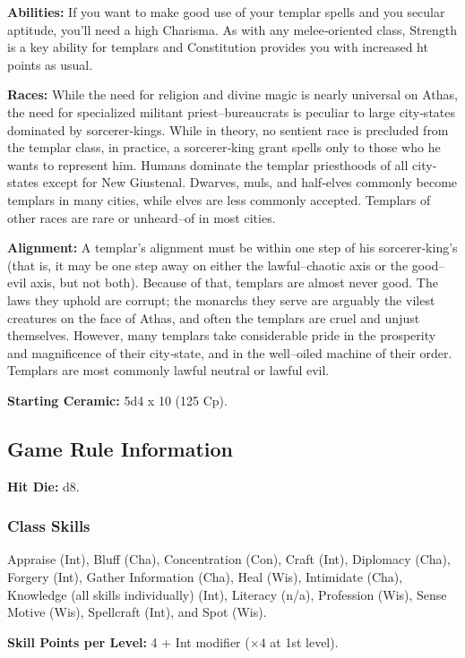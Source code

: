 \textbf{Abilities:} If you want to make good use of your templar spells and you secular aptitude, you'll need a high Charisma. As with any melee‐oriented class, Strength is a key ability for templars and Constitution provides you with increased ht points as usual.

\textbf{Races:} While the need for religion and divine magic is nearly universal on Athas, the need for specialized militant priest–bureaucrats is peculiar to large city‐states dominated by sorcerer‐kings. While in theory, no sentient race is precluded from the templar class, in practice, a sorcerer‐king grant spells only to those who he wants to represent him. Humans dominate the templar priesthoods of all city‐states except for New Giustenal. Dwarves, muls, and half‐elves commonly become templars in many cities, while elves are less commonly accepted. Templars of other races are rare or unheard–of in most cities.

\textbf{Alignment:} A templar's alignment must be within one step of his sorcerer‐king's (that is, it may be one step away on either the lawful–chaotic axis or the good–evil axis, but not both). Because of that, templars are almost never good. The laws they uphold are corrupt; the monarchs they serve are arguably the vilest creatures on the face of Athas, and often the templars are cruel and unjust themselves. However, many templars take considerable pride in the prosperity and magnificence of their city‐state, and in the well–oiled machine of their order. Templars are most commonly lawful neutral or lawful evil.

\textbf{Starting Ceramic:} 5d4 x 10 (125 Cp).

\subsection{Game Rule Information}

\textbf{Hit Die:} d8.

\subsubsection{Class Skills}
Appraise (Int), Bluff (Cha), Concentration (Con), Craft (Int), Diplomacy (Cha), Forgery (Int), Gather Information (Cha), Heal (Wis), Intimidate (Cha), Knowledge (all skills individually) (Int), Literacy (n/a), Profession (Wis), Sense Motive (Wis), Spellcraft (Int), and Spot (Wis).

\textbf{Skill Points per Level:} 4 + Int modifier ($\times 4$ at 1st level).

